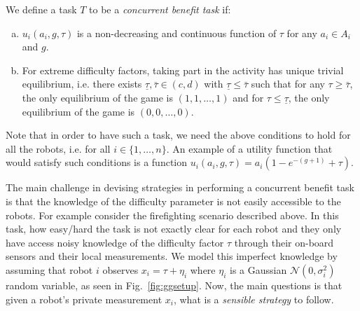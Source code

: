 \documentclass[conference]{ieeeconf}
\begin{document}
We define a task $T$ to be a \textit{concurrent benefit task} if: 
\begin{enumerate}[a.]
	\item $u_i(a_i,g,\tau)$ is a non-decreasing and continuous function of $\tau$ for any $a_i\in A_i$ and $g$. 
	\item For extreme difficulty factors, taking part in the activity has unique trivial equilibrium, i.e. there exists $\underline{\tau},\bar{\tau}\in (c,d)$ with $\underline{\tau}\leq \bar{\tau}$ such that for any $\tau\geq \bar{\tau}$, the only equilibrium of the game is $(1,1,\ldots,1)$ and for $\tau\leq \underline{\tau}$, the only equilibrium of the game is $(0,0,\ldots,0)$.
\end{enumerate}

Note that in order to have such a task, we need the above conditions to hold for all the robots, i.e. for all $i\in\{1,\ldots,n\}$.
An example of a utility function that would satisfy such conditions is a function $u_i(a_i,g,\tau)=a_i(1-e^{-(g+1)}+\tau)$.

The main challenge in devising strategies in performing a concurrent benefit task is that the knowledge of the difficulty parameter is not easily accessible to the robots. For example consider the firefighting scenario described above. In this task, how easy/hard the task is not exactly clear for each robot and they only have access noisy knowledge of the difficulty factor $\tau$ through their on-board sensors and their local measurements.  We model this imperfect knowledge by assuming that robot $i$ observes $x_i=\tau+\eta_i$ where $\eta_i$ is a Gaussian $\mathcal{N}(0,\sigma_i^2)$ random variable, as seen in Fig.~\ref{fig:ggsetup}. Now, the main questions is that given a robot's private measurement $x_i$, what is a \textit{sensible strategy} to follow. 
\end{document}
